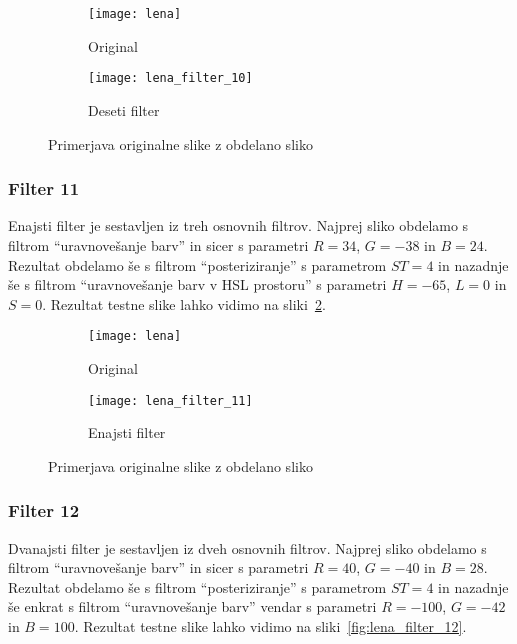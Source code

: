 \begin{figure}[!ht]
    \centering
    \begin{subfigure}[b]{0.4\textwidth}
        \texttt{[image: lena]}
        \caption{Original}
    \end{subfigure}
    \begin{subfigure}[b]{0.4\textwidth}
        \texttt{[image: lena\_filter\_10]}
        \caption{Deseti filter}
    \end{subfigure}
    \caption{Primerjava originalne slike z obdelano sliko}
    \label{fig:lena_filter_10}
\end{figure}


\subsubsection*{Filter 11}
Enajsti filter je sestavljen iz treh osnovnih filtrov. Najprej sliko obdelamo s
filtrom ``uravnovešanje barv'' in sicer s parametri $R = 34$, $G = -38$ in
$B = 24$. Rezultat obdelamo še s filtrom ``posteriziranje'' s parametrom
$ST= 4$ in nazadnje še s filtrom ``uravnovešanje barv v HSL prostoru'' s
parametri $H = -65$, $L = 0$ in $S = 0$. Rezultat testne slike lahko
vidimo na sliki~\ref{fig:lena_filter_11}.

\begin{figure}[!ht]
    \centering
    \begin{subfigure}[b]{0.4\textwidth}
        \texttt{[image: lena]}
        \caption{Original}
    \end{subfigure}
    \begin{subfigure}[b]{0.4\textwidth}
        \texttt{[image: lena\_filter\_11]}
        \caption{Enajsti filter}
    \end{subfigure}
    \caption{Primerjava originalne slike z obdelano sliko}
    \label{fig:lena_filter_11}
\end{figure}


\subsubsection*{Filter 12}
Dvanajsti filter je sestavljen iz dveh osnovnih filtrov. Najprej sliko obdelamo s
filtrom ``uravnovešanje barv'' in sicer s parametri $R = 40$, $G = -40$ in
$B = 28$. Rezultat obdelamo še s filtrom ``posteriziranje'' s parametrom
$ST= 4$ in nazadnje še enkrat s filtrom ``uravnovešanje barv'' vendar s
parametri $R = -100$, $G = -42$ in $B = 100$. Rezultat testne slike lahko
vidimo na sliki~\ref{fig:lena_filter_12}.

